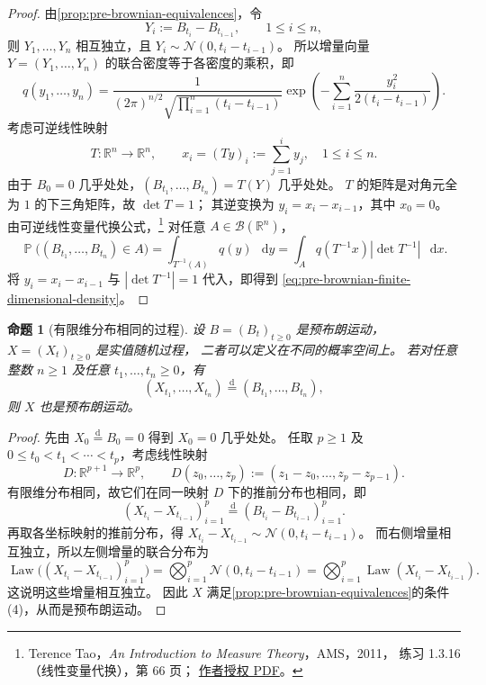 \documentclass[UTF8,11pt,a4paper,oneside,fontset=fandol]{ctexrep}
\numberwithin{equation}{section}
\theoremstyle{plain}
\newtheorem{proposition}[theorem]{命题}
\theoremstyle{definition}
\theoremstyle{remark}
\newcommand{\R}{\mathbb{R}}
\newcommand{\B}{\mathcal{B}}
\DeclareMathOperator{\Prob}{\mathbb{P}}
\DeclareMathOperator{\Law}{Law}
\newcommand{\dd}{\mathop{}\!\mathrm{d}}
\begin{document}
\begin{proof}
由\cref{prop:pre-brownian-equivalences}，令
\[
  Y_i:=B_{t_i}-B_{t_{i-1}},\qquad 1\le i\le n,
\]
则 $Y_1,\ldots,Y_n$ 相互独立，且 $Y_i\sim\mathcal{N}(0,t_i-t_{i-1})$。
所以增量向量 $Y=(Y_1,\ldots,Y_n)$ 的联合密度等于各密度的乘积，即
\[
  q(y_1,\ldots,y_n)
  =\frac{1}{(2\pi)^{n/2}\sqrt{\prod_{i=1}^{n}(t_i-t_{i-1})}}
    \exp\!\left(-\sum_{i=1}^{n}\frac{y_i^2}{2(t_i-t_{i-1})}\right).
\]
考虑可逆线性映射
\[
  T:\R^n\longrightarrow\R^n,\qquad
  x_i=(Ty)_i:=\sum_{j=1}^{i}y_j,\quad 1\le i\le n.
\]
由于 $B_0=0$ 几乎处处，$(B_{t_1},\ldots,B_{t_n})=T(Y)$ 几乎处处。
$T$ 的矩阵是对角元全为 $1$ 的下三角矩阵，故 $\det T=1$；
其逆变换为 $y_i=x_i-x_{i-1}$，其中 $x_0=0$。
由可逆线性变量代换公式，\footnote{%
Terence Tao，\emph{An Introduction to Measure Theory}，AMS，2011，
练习 1.3.16（线性变量代换），第 66 页；
\href{https://terrytao.wordpress.com/wp-content/uploads/2012/12/gsm-126-tao5-measure-book.pdf}{作者授权 PDF}。}
对任意 $A\in\B(\R^n)$，
\[
  \Prob\bigl((B_{t_1},\ldots,B_{t_n})\in A\bigr)
  =\int_{T^{-1}(A)}q(y)\,\dd y
  =\int_A q(T^{-1}x)|\det T^{-1}|\,\dd x.
\]
将 $y_i=x_i-x_{i-1}$ 与 $|\det T^{-1}|=1$ 代入，即得到
\cref{eq:pre-brownian-finite-dimensional-density}。
\end{proof}

\begin{proposition}[有限维分布相同的过程]
\label{prop:pre-brownian-same-finite-dimensional-laws}
设 $B=(B_t)_{t\ge0}$ 是预布朗运动，$X=(X_t)_{t\ge0}$ 是实值随机过程，
二者可以定义在不同的概率空间上。
若对任意整数 $n\ge1$ 及任意 $t_1,\ldots,t_n\ge0$，有
\[
  (X_{t_1},\ldots,X_{t_n})\overset{\mathrm d}{=}
  (B_{t_1},\ldots,B_{t_n}),
\]
则 $X$ 也是预布朗运动。
\end{proposition}

\begin{proof}
先由 $X_0\overset{\mathrm d}{=}B_0=0$ 得到 $X_0=0$ 几乎处处。
任取 $p\ge1$ 及 $0\le t_0<t_1<\cdots<t_p$，考虑线性映射
\[
  D:\R^{p+1}\longrightarrow\R^p,\qquad
  D(z_0,\ldots,z_p):=(z_1-z_0,\ldots,z_p-z_{p-1}).
\]
有限维分布相同，故它们在同一映射 $D$ 下的推前分布也相同，即
\[
  (X_{t_i}-X_{t_{i-1}})_{i=1}^{p}
  \overset{\mathrm d}{=}
  (B_{t_i}-B_{t_{i-1}})_{i=1}^{p}.
\]
再取各坐标映射的推前分布，得
$X_{t_i}-X_{t_{i-1}}\sim\mathcal{N}(0,t_i-t_{i-1})$。
而右侧增量相互独立，所以左侧增量的联合分布为
\[
  \Law\bigl((X_{t_i}-X_{t_{i-1}})_{i=1}^{p}\bigr)
  =\bigotimes_{i=1}^{p}\mathcal{N}(0,t_i-t_{i-1})
  =\bigotimes_{i=1}^{p}\Law(X_{t_i}-X_{t_{i-1}}).
\]
这说明这些增量相互独立。
因此 $X$ 满足\cref{prop:pre-brownian-equivalences}的条件 (4)，从而是预布朗运动。
\end{proof}
\end{document}

